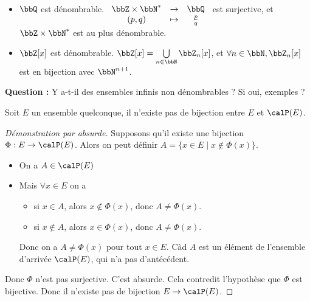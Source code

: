 \begin{cor}
    $\ $
    \begin{itemize}
        \item $\bbQ$ est dénombrable.
              $
                  \begin{array}[t]{ccc}
                      \bbZ \times \bbN^* & \to & \bbQ        \\
                      (p, q)             & \tp & \frac{p}{q}
                  \end{array}
              $ est surjective, et $\bbZ \times \bbN^*$ est au plus dénombrable.
        \item $\bbZ[x]$ est dénombrable.
              $\bbZ[x] = \bigcup\limits_{n \in \bbN} \bbZ_n[x]$,
              et $\forall n \in \bbN, \bbZ_n[x]$ est en bijection avec $\bbN^{n + 1}$.
    \end{itemize}
\end{cor}

\textbf{Question :} Y a-t-il des ensembles infinis non dénombrables ? Si oui, exemples ?

\begin{thm}
    Soit $E$ un ensemble quelconque, il n'existe pas de bijection entre $E$ et $\calP(E)$.
\end{thm}

\begin{proof}[Démonstration par absurde]
    Supposons qu'il existe une bijection $\Phi: E \to \calP(E)$.
    Alors on peut définir $A = \{ x \in E \mid x \notin \Phi(x) \}$.
    \begin{itemize}
        \item On a $A \in \calP(E)$
        \item Mais $\forall x \in E$ on a
              \begin{itemize}
                  \item si $x \in A$, alors $x \notin \Phi(x)$, donc $A \neq \Phi(x)$.
                  \item si $x \notin A$, alors $x \in \Phi(x)$, donc $A \neq \Phi(x)$.
              \end{itemize}

              Donc on a $A \neq \Phi(x)$ pour tout $x \in E$.
              Càd $A$ est un élément de l'ensemble d'arrivée $\calP(E)$, qui n'a pas d'antécédent.
    \end{itemize}

    Donc $\Phi$ n'est pas surjective. C'est absurde. Cela contredit l'hypothèse que $\Phi$ est bijective.
    Donc il n'existe pas de bijection $E \to \calP(E)$. \qedhere
\end{proof}

